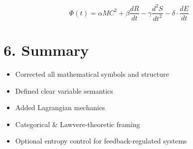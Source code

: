 \documentclass[12pt]{article}
\begin{document}
\[
\Phi(t) = \alpha M C^2 + \beta \frac{dR}{dt} - \gamma \frac{d^2S}{dt^2} - \delta \cdot \frac{dE}{dt}
\]

\section*{6. Summary}

\begin{itemize}
  \item Corrected all mathematical symbols and structure
  \item Defined clear variable semantics
  \item Added Lagrangian mechanics
  \item Categorical \& Lawvere-theoretic framing
  \item Optional entropy control for feedback-regulated systems
\end{itemize}
\end{document}
